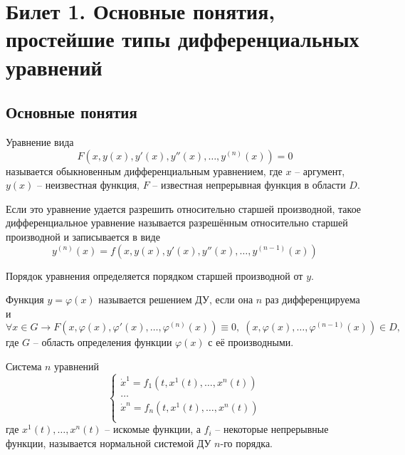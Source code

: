 \section{Билет 1. Основные понятия, простейшие типы дифференциальных уравнений}
\subsection{Основные понятия}

\begin{definition} 
    Уравнение вида \[F(x, y(x), y'(x), y''(x), \dots, y^{(n)}(x)) = 0\] называется обыкновенным дифференциальным уравнением,
    где $x$ -- аргумент, $y(x)$ -- неизвестная функция, $F$ -- известная непрерывная функция в области $D$.
\end{definition}

\begin{definition}
    Если это уравнение удается разрешить относительно старшей производной, такое дифференциальное
    уравнение называется разрешённым относительно старшей производной и записывается в виде
    \[y^{(n)}(x) = f(x, y(x), y'(x), y''(x), \dots, y^{(n - 1)}(x))\]
\end{definition}

Порядок уравнения определяется порядком старшей производной от $y$.

\begin{definition}
    Функция $y = \varphi(x)$ называется решением ДУ, если она $n$ раз дифференцируема и
    \[\forall x \in G \rightarrow F(x, \varphi(x), \varphi'(x), \dots, \varphi^{(n)}(x)) \equiv 0, \; (x, \varphi(x), \dots, \varphi^{(n - 1)}(x)) \in D,\]
    где $G$ -- область определения функции $\varphi(x)$ с её производными.
\end{definition}

\begin{definition}
    Система $n$ уравнений
    \begin{equation}
        \begin{cases}
            \dot x^1 = f_1(t, x^1(t), \dots, x^n(t)) \\
            \dots \\
            \dot x^n = f_n(t, x^1(t), \dots, x^n(t)) \\
        \end{cases}
    \end{equation}
    где $x^1(t), \dots, x^n(t)$ -- искомые функции, а $f_i$ -- некоторые непрерывные функции, называется нормальной системой ДУ $n$-го порядка.
\end{definition}

